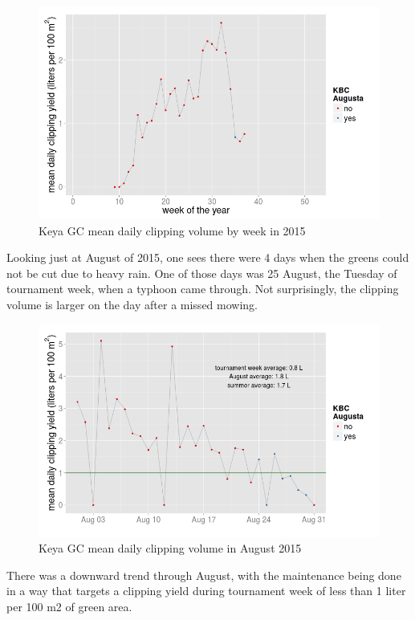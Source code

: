 \documentclass[12pt,b5,]{tufte-book}
\begin{document}
\begin{figure}
\centering
\includegraphics{img/b4-4.png}
\caption{Keya GC mean daily clipping volume by week in 2015}
\end{figure}

Looking just at August of 2015, one sees there were 4 days when the greens could not be cut due to heavy rain. One of those days was 25 August, the Tuesday of tournament week, when a typhoon came through. Not surprisingly, the clipping volume is larger on the day after a missed mowing.

\begin{figure}
\centering
\includegraphics{img/b4-5.png}
\caption{Keya GC mean daily clipping volume in August 2015}
\end{figure}

There was a downward trend through August, with the maintenance being done in a way that targets a clipping yield during tournament week of less than 1 liter per 100 m2 of green area.
\end{document}
